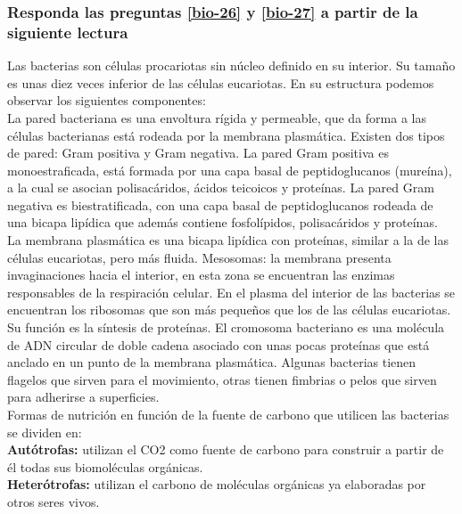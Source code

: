 \begin{enumerate}



\subsubsection*{Responda las preguntas \ref{bio-26} y \ref{bio-27} a partir de la  siguiente lectura}


\noindent Las bacterias son células procariotas sin núcleo definido en su interior. Su tamaño es unas diez veces inferior  de las células eucariotas. En su estructura podemos observar los siguientes componentes:\\
La pared bacteriana es una envoltura rígida y permeable, que da forma a las células bacterianas está rodeada por la membrana plasmática. Existen dos tipos de pared: Gram positiva y Gram negativa. La pared Gram positiva es monoestraficada, está formada por una capa basal de peptidoglucanos (mureína), a la cual se asocian polisacáridos, ácidos teicoicos y proteínas. La pared Gram negativa es biestratificada, con una capa basal de peptidoglucanos rodeada de una bicapa lipídica que además contiene fosfolípidos, polisacáridos y proteínas.\\

La membrana plasmática es una bicapa lipídica con proteínas, similar a la de las células eucariotas, pero más fluida. Mesosomas: la membrana presenta invaginaciones hacia el interior, en esta zona se encuentran las enzimas responsables de la respiración celular.  En el plasma del interior de las bacterias se encuentran los ribosomas que son más pequeños que los de las células eucariotas. Su función es la síntesis de proteínas. El cromosoma bacteriano es una molécula de ADN circular de doble cadena asociado con unas pocas proteínas que está anclado en un punto de la membrana plasmática.  Algunas bacterias tienen flagelos que sirven para el movimiento, otras tienen fimbrias o pelos  que sirven para adherirse a superficies.\\

Formas de nutrición en función de la fuente de carbono que utilicen las bacterias se dividen en:\\

\textbf{Autótrofas:} utilizan el CO2 como fuente de carbono para construir a partir de él todas sus biomoléculas orgánicas.\\

\textbf{Heterótrofas:} utilizan el carbono de moléculas orgánicas ya elaboradas por otros seres vivos.\\


\end{enumerate}
